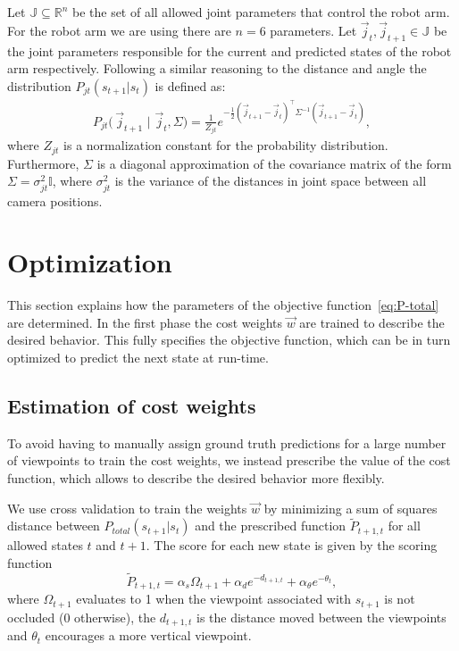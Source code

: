 \documentclass[10pt,twocolumn,letterpaper]{article}
\begin{document}
Let $\mathbb{J}\subseteq \mathbb{R}^{n}$ be the set of all allowed joint parameters that control the robot arm. 
For the robot arm we are using there are $n=6$ parameters. 
Let $\vec{j}_{t}, \vec{j}_{t+1} \in \mathbb{J}$ be the joint parameters responsible for the current and predicted states of the robot arm respectively. 
Following a similar reasoning to the distance and angle the distribution $P_{jt}(s_{t+1}|s_{t})$ is defined as:
\begin{equation}
\begin{split}
  P_{jt}\bigl(\,\vec{j}_{t+1} \,\, | \,\,\vec{j}_{t},\Sigma \bigr) =
  \frac{1}{Z_{jt}} e^{-\frac{1}{2} (\vec{j}_{t+1}-\vec{j}_{t})^{\intercal}\Sigma^{-1}(\vec{j}_{t+1}-\vec{j}_{t})},
\end{split}
\end{equation}
where $Z_{jt}$ is a normalization constant for the probability distribution. 
Furthermore, $\Sigma$ is a diagonal approximation of the covariance matrix of the form $\Sigma=\sigma_{jt}^2 \mathbb{I}$,
where $\sigma_{jt} ^2$ is the variance of the distances in joint space between all camera positions.

\section{Optimization}

This section explains how the parameters of the objective function~\eqref{eq:P-total} are determined. In the first phase the cost weights $\vec{w}$ are trained to describe the desired behavior. 
This fully specifies the objective function, which can be in turn optimized to predict the next state at run-time.

\subsection{Estimation of cost weights}
To avoid having to manually assign ground truth predictions for a large number of viewpoints to train the cost weights, we instead prescribe the value of the cost function, which allows to describe the desired behavior more flexibly. 

We use cross validation to train the weights $\vec{w}$ by minimizing a sum of squares distance between $P_{total}(s_{t+1}|s_{t})$ and the prescribed function $\tilde{P}_{t+1,t}$ for all allowed states $t$ and $t+1$. 
The score for each new state is given by the scoring function
\begin{equation}\label{eq:target-cost}
\tilde{P}_{t+1,t} = \alpha_{s} \Omega_{t+1} + \alpha_{d} e^{-d_{t+1,t}} + 
  \alpha_{\theta}e^{-\theta_{t}},
\end{equation}
where $\Omega_{t+1}$ evaluates to 1 when the viewpoint associated with $s_{t+1}$ is not occluded (0 otherwise), the $d_{t+1,t}$ is the distance moved between the viewpoints and $\theta_t$ encourages a more vertical viewpoint.
\end{document}
